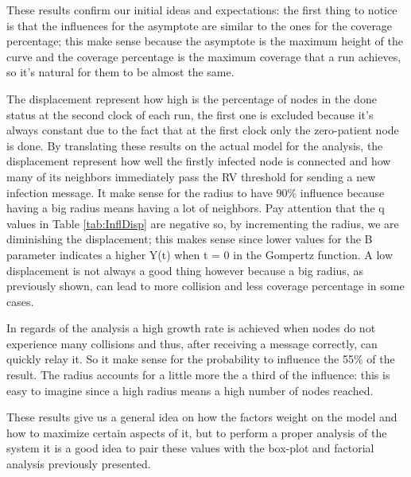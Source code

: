 These results confirm our initial ideas and expectations: the first thing to notice is that the influences for the asymptote are similar to the ones for the coverage percentage; this make sense because the asymptote is the maximum height of the curve and the coverage percentage is the maximum coverage that a run achieves, so it's natural for them to be almost the same. 

\medskip
The displacement represent how high is the percentage of nodes in the done status at the second clock of each run, the first one is excluded because it's always constant due to the fact that at the first clock only the zero-patient node is done. By translating these results on the actual model for the analysis, the displacement represent how well the firstly infected node is connected and how many of its neighbors immediately pass the RV threshold for sending a new infection message. It make sense for the radius to have 90\% influence because having a big radius means having a lot of neighbors. Pay attention that the q values in Table \ref{tab:InflDisp} are negative so, by incrementing the radius, we are diminishing the displacement; this makes sense since lower values for the B parameter indicates a higher Y(t) when t = 0 in the Gompertz function. A low displacement is not always a good thing however because a big radius, as previously shown, can lead to more collision and less coverage percentage in some cases. 

\medskip
In regards of the analysis a high growth rate is achieved when nodes do not experience many collisions and thus, after receiving a message correctly, can quickly relay it. So it make sense for the probability to influence the 55\% of the result. The radius accounts for a little more the a third of the influence: this is easy to imagine since a high radius means a high number of nodes reached.

\medskip
These results give us a general idea on how the factors weight on the model and how to maximize certain aspects of it, but to perform a proper analysis of the system it is a good idea to pair these values with the box-plot and factorial analysis previously presented.